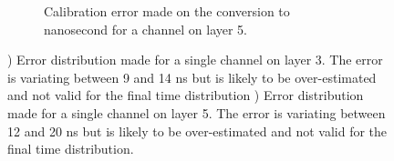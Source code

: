 \begin{figure}[htbp!]
\begin{subfigure}[t]{0.45\textwidth}
		\caption{Calibration error made on the conversion to nanosecond for a channel on layer 5.} \label{fig:error_chn2}
	\end{subfigure}
	\caption{) Error distribution made for a single channel on layer 3. The error is variating between 9 and 14 ns but is likely to be over-estimated and not valid for the final time distribution ) Error distribution made for a single channel on layer 5. The error is variating between 12 and 20 ns but is likely to be over-estimated and not valid for the final time distribution.}
\end{figure}
